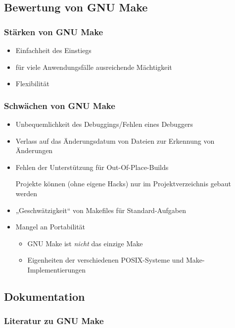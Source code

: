 \subsection{Bewertung von GNU Make}
\begin{frame}
	\frametitle{Stärken von GNU Make}
	\begin{itemize}
		\pause
		\item Einfachheit des Einstiegs
		\pause
		\item für viele Anwendungsfälle ausreichende Mächtigkeit
		\pause
		\item Flexibilität
	\end{itemize}
\end{frame}

\begin{frame}
	\frametitle{Schwächen von GNU Make}
	\begin{itemize}
		\pause
		\item Unbequemlichkeit des Debuggings/Fehlen eines Debuggers
		\pause
		\item Verlass auf das Änderungsdatum von Dateien zur Erkennung von Änderungen
		\pause
		\item Fehlen der Unterstützung für Out-Of-Place-Builds

			Projekte können (ohne eigene Hacks) nur im Projektverzeichnis gebaut werden
		\pause
		\item „Geschwätzigkeit“ von Makefiles für Standard-Aufgaben
		\pause
		\item Mangel an Portabilität
			\begin{itemize}
				\pause
				\item GNU Make ist \emph{nicht} das einzige Make
				\pause
				\item Eigenheiten der verschiedenen POSIX-Systeme und Make-Implementierungen
			\end{itemize}
	\end{itemize}
\end{frame}

\subsection{Dokumentation}
\begin{frame}
	\frametitle{Literatur zu GNU Make}
\end{frame}
